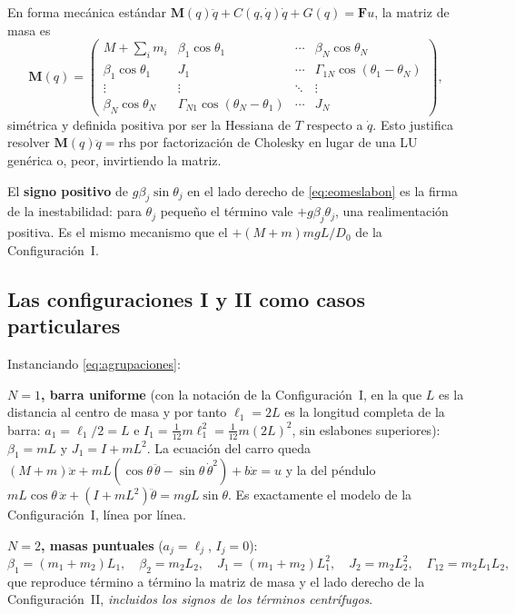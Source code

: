 \documentclass[11pt,letterpaper]{article}
\theoremstyle{definition}
\theoremstyle{plain}
\theoremstyle{remark}
\newcommand{\Mm}{\bm{M}}
\newcommand{\Fm}{\bm{F}}
\begin{document}
En forma mecánica estándar $\Mm(q)\ddot q+C(q,\dot q)\dot q+G(q)=\Fm u$, la
matriz de masa es
\begin{equation}
\Mm(q)=\begin{pmatrix}
M+\sum_i m_i & \beta_1\cos\theta_1 & \cdots & \beta_N\cos\theta_N\\
\beta_1\cos\theta_1 & J_1 & \cdots & \Gamma_{1N}\cos(\theta_1-\theta_N)\\
\vdots & \vdots & \ddots & \vdots\\
\beta_N\cos\theta_N & \Gamma_{N1}\cos(\theta_N-\theta_1) & \cdots & J_N
\end{pmatrix},
\label{eq:massmatrix}
\end{equation}
simétrica y definida positiva por ser la Hessiana de $T$ respecto a $\dot q$.
Esto justifica resolver $\Mm(q)\ddot q=\text{rhs}$ por factorización de Cholesky
en lugar de una LU genérica o, peor, invirtiendo la matriz.

El \textbf{signo positivo} de $g\beta_j\sin\theta_j$ en el lado derecho de
\cref{eq:eomeslabon} es la firma de la inestabilidad: para $\theta_j$ pequeño el
término vale $+g\beta_j\theta_j$, una realimentación positiva. Es el mismo
mecanismo que el $+(M+m)mgL/D_0$ de la Configuración~I.

\subsection{Las configuraciones I y II como casos particulares}
\label{sec:casosparticulares}

Instanciando \cref{eq:agrupaciones}:

\textbf{$N=1$, barra uniforme} (con la notación de la Configuración~I, en la que
$L$ es la distancia al centro de masa y por tanto $\ell_1=2L$ es la longitud
completa de la barra: $a_1=\ell_1/2=L$ e $I_1=\tfrac{1}{12}m\ell_1^2=\tfrac{1}{12}m(2L)^2$,
sin eslabones superiores): $\beta_1=mL$ y $J_1=I+mL^2$. La ecuación del carro queda
$(M+m)\ddot x+mL(\cos\theta\,\ddot\theta-\sin\theta\,\dot\theta^2)+b\dot x=u$ y
la del péndulo $mL\cos\theta\,\ddot x+(I+mL^2)\ddot\theta=mgL\sin\theta$. Es
exactamente el modelo de la Configuración~I, línea por línea.

\textbf{$N=2$, masas puntuales} ($a_j=\ell_j$, $I_j=0$):
\[
\beta_1=(m_1+m_2)L_1,\quad \beta_2=m_2L_2,\quad
J_1=(m_1+m_2)L_1^2,\quad J_2=m_2L_2^2,\quad \Gamma_{12}=m_2L_1L_2,
\]
que reproduce término a término la matriz de masa y el lado derecho de la
Configuración~II, \emph{incluidos los signos de los términos centrífugos}.
\end{document}
